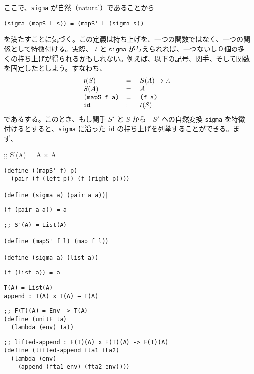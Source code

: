 \documentclass[11pt, oneside]{jsbook}   	%
\begin{document}
ここで、\verb|sigma| が自然（natural）であることから
\begin{lstlisting}
(sigma (mapS L s)) = (mapS' L (sigma s))
\end{lstlisting}
を満たすことに気づく。この定義は持ち上げを、一つの関数ではなく、一つの関係として特徴付ける。実際、 $t$ と \verb|sigma| が与えられれば、一つないし０個の多くの持ち上げが得られるかもしれない。例えば、以下の記号、関手、そして関数を固定したとしよう。すなわち、
$$
\begin{array}{lll}
t(S)  &= \; &S(A) \rightarrow A \\
S(A) &= & A \\
\verb|(mapS f a)| &=  &\verb|(f a)| \\
\verb|id| &: & t(S)
\end{array}
$$
であるする。このとき、もし関手 $S'$ と $S$ から　$S'$ への自然変換 \verb|sigma| を特徴付けるとすると、\verb|sigma| に沿った \verb|id| の持ち上げを列挙することができる。まず、

;; S'(A) = A × A
\begin{lstlisting}
(define ((mapS' f) p)
  (pair (f (left p)) (f (right p))))

(define (sigma a) (pair a a))|
\end{lstlisting}

\begin{lstlisting}
(f (pair a a)) = a
\end{lstlisting}

\begin{lstlisting}
;; S'(A) = List(A)

(define (mapS' f l) (map f l))

(define (sigma a) (list a))
\end{lstlisting}

\begin{lstlisting}
(f (list a)) = a
\end{lstlisting}

\begin{lstlisting}
T(A) = List(A)
append : T(A) x T(A) → T(A) 
\end{lstlisting}

\begin{lstlisting}
;; F(T)(A) = Env -> T(A)
(define (unitF ta)
  (lambda (env) ta))
\end{lstlisting}

\begin{lstlisting}
;; lifted-append : F(T)(A) x F(T)(A) -> F(T)(A)
(define (lifted-append fta1 fta2)
  (lambda (env)
    (append (fta1 env) (fta2 env))))
\end{lstlisting}
\end{document}
